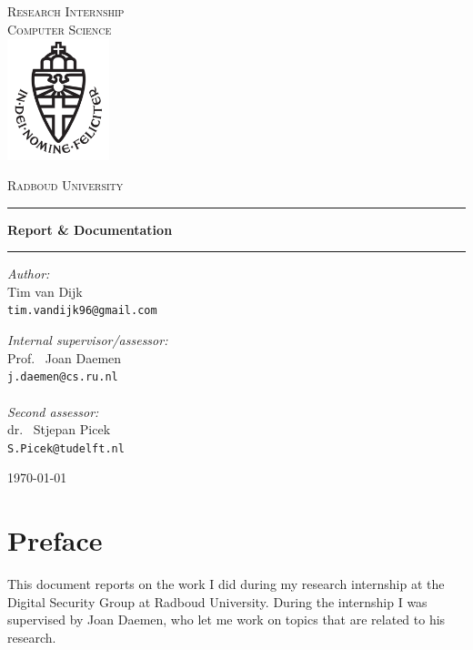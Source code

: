 \documentclass{report}
\begin{document}
\begin{titlepage}
\begin{center}
\textsc{\LARGE Research Internship\\Computer Science}\\[1.5cm]
\includegraphics[height=100pt]{imgs/logo}

\vspace{0.4cm}
\textsc{\Large Radboud University}\\[1cm]
\hrule
\vspace{0.4cm}
\textbf{\huge Report \& Documentation
}\\[0.4cm]
\hrule
\vspace{2cm}
\begin{minipage}[t]{0.45\textwidth}
\begin{flushleft} \large
\textit{Author:}\\
Tim van Dijk\\
\texttt{tim.vandijk96@gmail.com}
\end{flushleft}
\end{minipage}
\begin{minipage}[t]{0.45\textwidth}
\begin{flushright} \large
\textit{Internal supervisor/assessor:}\\
Prof. \, Joan Daemen\\
\texttt{j.daemen@cs.ru.nl}\\[1.3cm]
\texttt{}\\[1.3cm]
\textit{Second assessor:}\\
dr. \, Stjepan Picek \\
\texttt{S.Picek@tudelft.nl}
\end{flushright}
\end{minipage}
\vfill
{\large \today}
\end{center}
\end{titlepage}

\tableofcontents
\chapter*{Preface}
This document reports on the work I did during my research internship at the Digital Security Group at Radboud University. During the internship I was supervised by Joan Daemen, who let me work on topics that are related to his research.
\end{document}
